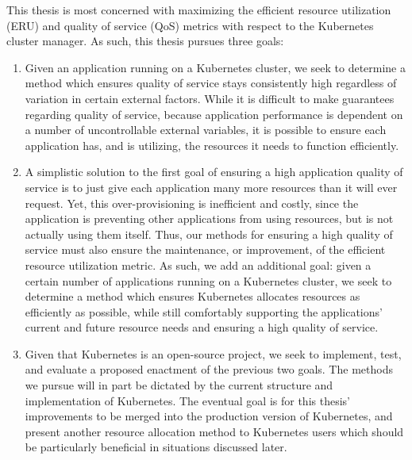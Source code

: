 This thesis is most concerned with maximizing the efficient resource utilization
(ERU) and quality of service (QoS) metrics with respect to the Kubernetes cluster manager.
As such, this thesis pursues three goals:

\begin{enumerate}
  \item Given an application running on a Kubernetes cluster, we seek to
    determine a method which ensures quality of
    service stays consistently high regardless of variation in
    certain external factors. While it is
    difficult to make guarantees regarding quality of service, because
    application performance is dependent on a number of uncontrollable
    external variables, it is possible to
    ensure each application has, and is utilizing, the resources it needs to
    function efficiently.
  \item A simplistic solution to the first goal of ensuring a high application
    quality of service is to just give each application many more resources than
    it will ever request. Yet, this over-provisioning is inefficient and costly,
    since the application is preventing other applications from using resources,
    but is not actually using them itself. Thus, our
    methods for ensuring a high quality of service must also ensure the
    maintenance, or improvement, of the efficient resource utilization metric.
    As such, we add an additional goal: given a certain number of applications
    running on a Kubernetes cluster,
    we seek to determine a method which ensures Kubernetes allocates resources
    as efficiently as possible, while still comfortably
    supporting the applications' current and future resource needs and
    ensuring a high quality of service.
  \item Given that Kubernetes is an open-source project, we seek to implement, test, and
    evaluate a proposed enactment of the previous two goals.
    The methods we pursue will
    in part be dictated by the current structure and implementation of
    Kubernetes. The eventual goal is for this
    thesis' improvements to be merged into the production version of Kubernetes,
    and present another resource allocation method to Kubernetes users which
    should be particularly beneficial in situations discussed later.
\end{enumerate}

